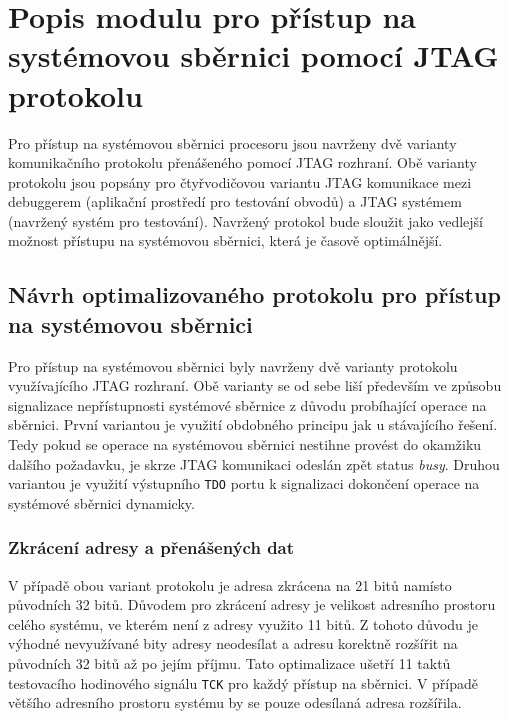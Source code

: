 \chapter{Popis modulu pro přístup na systémovou sběrnici pomocí \acs{JTAG} protokolu}	\label{jtag_ap}
Pro přístup na systémovou sběrnici procesoru jsou navrženy dvě varianty komunikačního protokolu přenášeného pomocí JTAG rozhraní. Obě varianty protokolu jsou popsány pro čtyřvodičovou variantu \acs{JTAG} komunikace mezi debuggerem (aplikační prostředí pro testování obvodů) a \acs{JTAG} systémem (navržený systém pro testování). Navržený protokol bude sloužit jako vedlejší možnost přístupu na systémovou sběrnici, která je časově optimálnější.

\section{Návrh optimalizovaného protokolu pro přístup na systémovou sběrnici}	\label{sec:protokoly}
Pro přístup na systémovou sběrnici byly navrženy dvě varianty protokolu využívajícího JTAG rozhraní. Obě varianty se od sebe liší především ve způsobu signalizace nepřístupnosti systémové sběrnice z důvodu probíhající operace na sběrnici. První variantou je využití obdobného principu jak u stávajícího řešení. Tedy pokud se operace na systémovou sběrnici nestihne provést do okamžiku dalšího požadavku, je skrze JTAG komunikaci odeslán zpět status \textit{busy}. Druhou variantou je využití výstupního \texttt{\acs{TDO}} portu k signalizaci dokončení operace na systémové sběrnici dynamicky.

\subsection{Zkrácení adresy a přenášených dat}
V případě obou variant protokolu je adresa zkrácena na 21 bitů namísto původních 32 bitů. Důvodem pro zkrácení adresy je velikost adresního prostoru celého systému, ve kterém není z adresy využito 11 bitů. Z tohoto důvodu je výhodné nevyužívané bity adresy neodesílat a adresu korektně rozšířit na původních 32 bitů až po jejím příjmu. Tato optimalizace ušetří 11 taktů testovacího hodinového signálu \texttt{\acs{TCK}} pro každý přístup na sběrnici. V případě většího adresního prostoru systému by se pouze odesílaná adresa rozšířila.

